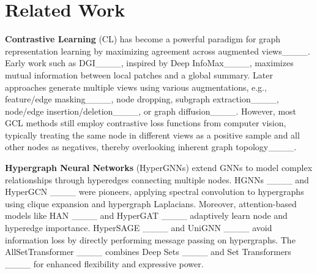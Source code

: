 \section{Related Work}
\textbf{Contrastive Learning} (CL) has become a powerful paradigm for graph representation learning by maximizing agreement across augmented views____. Early work such as DGI____, inspired by Deep InfoMax____, maximizes mutual information between local patches and a global summary. Later approaches generate multiple views using various augmentations, e.g., feature/edge masking____, node dropping, subgraph extraction____, node/edge insertion/deletion____, or graph diffusion____. However, most GCL methods still employ contrastive loss functions from computer vision, typically treating the same node in different views as a positive sample and all other nodes as negatives, thereby overlooking inherent graph topology____.

\textbf{Hypergraph Neural Networks} (HyperGNNs) extend GNNs to model complex relationships through hyperedges connecting multiple nodes. HGNNs ____ and HyperGCN ____ were pioneers, applying spectral convolution to hypergraphs using clique expansion and hypergraph Laplacians.
Moreover, attention-based models like HAN ____ and HyperGAT ____ adaptively learn node and hyperedge importance. HyperSAGE ____ and UniGNN ____ avoid information loss by directly performing message passing on hypergraphs. The AllSetTransformer ____ combines Deep Sets ____ and Set Transformers ____ for enhanced flexibility and expressive power.